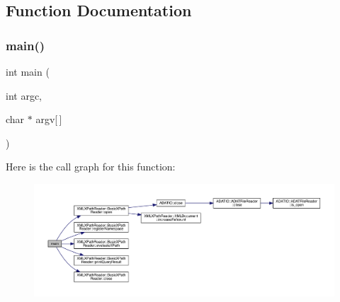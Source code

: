 \subsection{Function Documentation}
\mbox{\label{adat-devel_2other__libs_2xpath__reader_2examples_2basic__xpath__reader__test_8cc_a0ddf1224851353fc92bfbff6f499fa97}} 
\subsubsection{\texorpdfstring{main()}{main()}}
{\footnotesize\ttfamily int main (\begin{DoxyParamCaption}\item[{int}]{argc,  }\item[{char $\ast$}]{argv\mbox{[}$\,$\mbox{]} }\end{DoxyParamCaption})}

Here is the call graph for this function\+:
\nopagebreak
\begin{figure}[H]
\begin{center}
\leavevmode
\includegraphics[width=350pt]{dd/df8/adat-devel_2other__libs_2xpath__reader_2examples_2basic__xpath__reader__test_8cc_a0ddf1224851353fc92bfbff6f499fa97_cgraph}
\end{center}
\end{figure}
